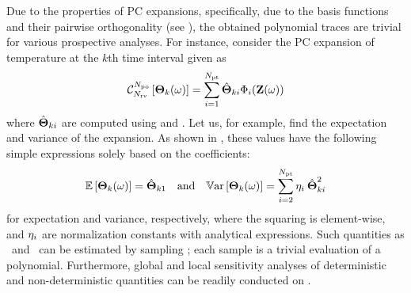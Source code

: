 Due to the properties of PC expansions, specifically, due to the basis functions and their pairwise orthogonality (see ), the obtained polynomial traces are trivial for various prospective analyses. For instance, consider the PC expansion of temperature at the $k$th time interval given as
\vspace{-0.2em}%
\begin{equation} \elabel{pc-k}
  \oPC{\vars}{\pcorder}{\vTO_k(\o)} = \sum_{i = 1}^{\pcterms} \pcc{\vTO}_{ki} \pcb_i(\vZ(\o))
\end{equation}
\vspace{-0.2em}%
where $\hat{{\boldsymbol\Theta}}_{ki}$ are computed using  and . Let us, for example, find the expectation and variance of the expansion. As shown in , these values have the following simple expressions solely based on the coefficients:
\vspace{-0.2em}%
\begin{equation} \elabel{pc-moments}
  \oExp{\vTO_k(\o)} = \pcc{\vTO}_{k1} \hspace{1em} \text{and} \hspace{1em} \oVar{\vTO_k(\o)} = \sum_{i = 2}^{\pcterms} \pcn_i \: \pcc{\vTO}_{ki}^2
\end{equation}
\vspace{-0.2em}%
for expectation and variance, respectively, where the squaring is element-wise, and $\eta_i$ are normalization constants with analytical expressions. Such quantities as \cdfs\ and \pdfs\ can be estimated by sampling ; each sample is a trivial evaluation of a polynomial. Furthermore, global and local sensitivity analyses of deterministic and non-deterministic quantities can be readily conducted on .
